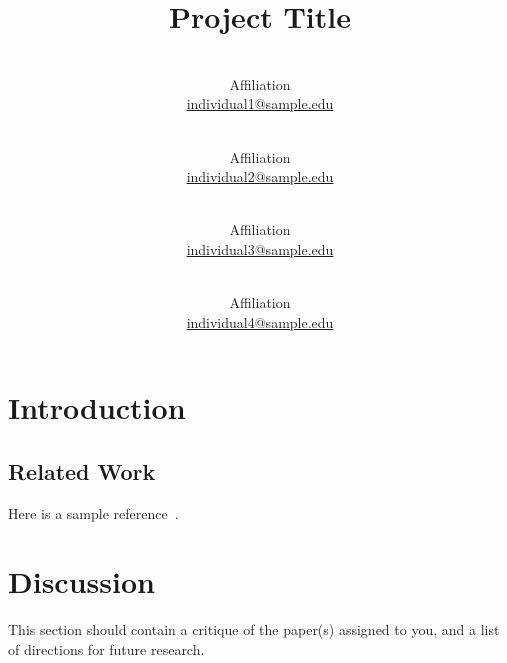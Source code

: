 \documentclass[11pt,a4paper,final]{article}
\begin{document}
\title{Project Title}

\author{
   \\
   Affiliation\\
   \url{individual1@sample.edu} \\
   \and
   \\
   Affiliation\\
   \url{individual2@sample.edu} \\
   \and
   \\
   Affiliation\\
   \url{individual3@sample.edu} \\
   \and
   \\
   Affiliation\\
   \url{individual4@sample.edu} \\
}

\date{}

\maketitle

\begin{abstract}
\lipsum[1-2]
\end{abstract}

\section{Introduction}

\lipsum[5-10]

\subsection{Related Work}

Here is a sample reference~\citep{sample2019}.

\section{Discussion}
This section should contain a critique of the paper(s) assigned to you, and a list of directions for future research.



\end{document}
